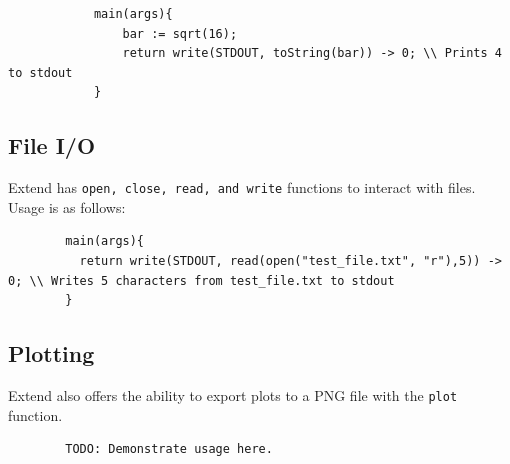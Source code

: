 		\begin{lstlisting}
			main(args){
				bar := sqrt(16);
				return write(STDOUT, toString(bar)) -> 0; \\ Prints 4 to stdout
			}
		\end{lstlisting}

	\subsection{File I/O}
	Extend has \texttt{open, close, read, and write} functions to interact with files. Usage is as follows:

	\begin{lstlisting}
		main(args){
		  return write(STDOUT, read(open("test_file.txt", "r"),5)) -> 0; \\ Writes 5 characters from test_file.txt to stdout
		}
	\end{lstlisting}

	\subsection{Plotting}
	Extend also offers the ability to export plots to a PNG file with the \texttt{plot} function.

	\begin{lstlisting}
		TODO: Demonstrate usage here.
	\end{lstlisting}
